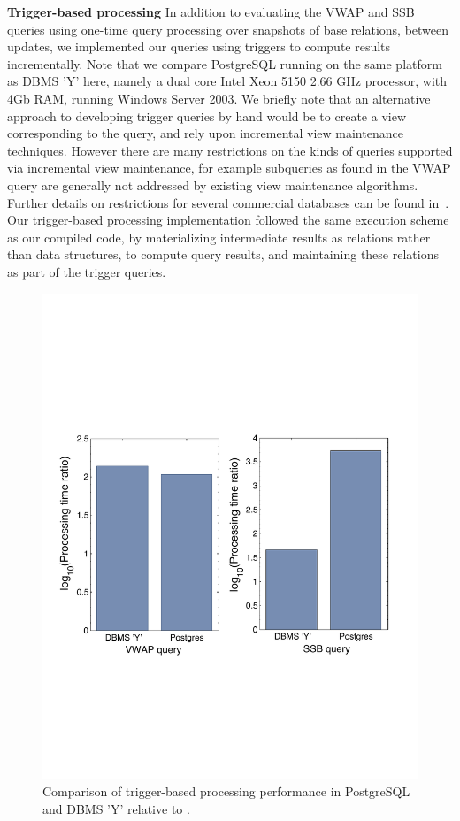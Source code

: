 \textbf{Trigger-based processing}
In addition to evaluating the VWAP and SSB queries using one-time query
processing over snapshots of base relations, between updates, we implemented our
queries using triggers to compute results incrementally. Note that we compare
PostgreSQL running on the same platform as DBMS 'Y' here, namely a dual core
Intel Xeon 5150 2.66 GHz processor, with 4Gb RAM, running Windows Server 2003. We
briefly note that an alternative approach to developing trigger queries by hand
would be to create a view corresponding to the query, and rely upon incremental
view maintenance techniques. However there are many restrictions on the kinds of
queries supported via incremental view maintenance, for example subqueries as
found in the VWAP query are generally not addressed by existing view maintenance
algorithms. Further details on restrictions for several commercial databases can
be found in~\cite{mssql-viewrestrict,db2-viewrestrict,oracle-viewrestrict}. Our
trigger-based processing implementation followed the same execution scheme as our
compiled code, by materializing intermediate results as relations rather than
data structures, to compute query results, and maintaining these relations as
part of the trigger queries.

\begin{figure}[tb]
\includegraphics[scale=0.43]{../plots/trigger_comparison.pdf}
\caption{Comparison of trigger-based processing performance in PostgreSQL and
DBMS 'Y' relative to \compiler.}
\label{fig:triggercomp}
\end{figure}

